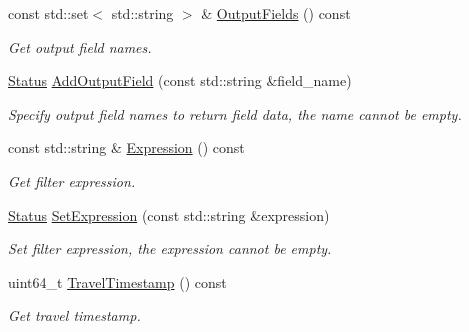 \begin{DoxyCompactItemize}
const std\+::set$<$ std\+::string $>$ \& \hyperlink{classmilvus_1_1_query_arguments_a31fb09de17771c1dad8bb550882193f1}{Output\+Fields} () const
\begin{DoxyCompactList}\small\item\em Get output field names. \end{DoxyCompactList}\item 
\mbox{\label{classmilvus_1_1_query_arguments_a8d83919df77dfe560d278aecb049bbd7}} 
\hyperlink{classmilvus_1_1_status}{Status} \hyperlink{classmilvus_1_1_query_arguments_a8d83919df77dfe560d278aecb049bbd7}{Add\+Output\+Field} (const std\+::string \&field\+\_\+name)
\begin{DoxyCompactList}\small\item\em Specify output field names to return field data, the name cannot be empty. \end{DoxyCompactList}\item 
\mbox{\label{classmilvus_1_1_query_arguments_a13a167fb62fb87e6fe63cf4f922a2ae6}} 
const std\+::string \& \hyperlink{classmilvus_1_1_query_arguments_a13a167fb62fb87e6fe63cf4f922a2ae6}{Expression} () const
\begin{DoxyCompactList}\small\item\em Get filter expression. \end{DoxyCompactList}\item 
\mbox{\label{classmilvus_1_1_query_arguments_a1d475057c34f81f51cdc98a8b3676292}} 
\hyperlink{classmilvus_1_1_status}{Status} \hyperlink{classmilvus_1_1_query_arguments_a1d475057c34f81f51cdc98a8b3676292}{Set\+Expression} (const std\+::string \&expression)
\begin{DoxyCompactList}\small\item\em Set filter expression, the expression cannot be empty. \end{DoxyCompactList}\item 
\mbox{\label{classmilvus_1_1_query_arguments_a775438bb6cbd1a1a397d15d319a33292}} 
uint64\+\_\+t \hyperlink{classmilvus_1_1_query_arguments_a775438bb6cbd1a1a397d15d319a33292}{Travel\+Timestamp} () const
\begin{DoxyCompactList}\small\item\em Get travel timestamp. \end{DoxyCompactList}\item 

\end{DoxyCompactItemize}
